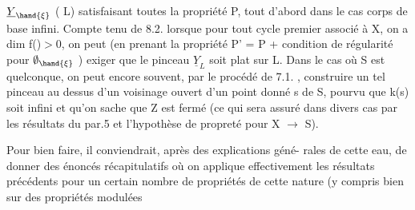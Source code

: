 $\underline{Y}_{\hand{\xi}}$ ( \hand{$\xi \in$}L) satisfaisant toutes la propriété P, tout d'abord dans le
cas  \hand{(}\hand{)} corps de base infini.  Compte tenu de
8.2.\hand{,} lorsque  pour tout cycle premier associé à X, on a dim f()$>$0,
on peut (en prenant la propriété P' = P + condition de régularité
pour $\emptyset_{\hand{\xi}}$ ) exiger que le pinceau $\underline{Y}_L$ soit plat sur L. Dans le cas
où S est quelconque, on peut encore souvent, par le procédé de 7.1. ,
construire un tel pinceau au dessus d'un voisinage ouvert d'un point
donné s de S, pourvu que k(s) soit infini et qu'on sache que Z est fermé
(ce qui sera assuré dans divers cas par les résultats du par.5 et
l'hypothèse de propreté pour X $\rightarrow$ S).

 Pour bien faire, il conviendrait, après des explications géné-%
rales de cette eau, de donner des énoncés récapitulatifs où on
applique effectivement les résultats précédents pour un certain nombre
de propriétés de cette nature (y compris bien sur des propriétés modulées\hand{)}

